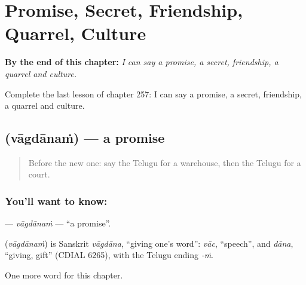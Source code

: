 
\chapter{Promise, Secret, Friendship, Quarrel, Culture}
\label{ch:te-promise-secret-friendship-quarrel-culture}

\begin{chapteropening}
\textbf{By the end of this chapter:} \emph{I can say a promise, a secret, friendship, a quarrel and culture.}

Complete the last lesson of chapter 257: I can say a promise, a secret, friendship, a quarrel and culture.
\end{chapteropening}

\section[\texorpdfstring{\te{వాగ్దానం} (vāgdānaṁ)}{వాగ్దానం (vāgdānaṁ)}]{ (vāgdānaṁ) — a promise}

\label{lesson:TE-C257-vagdanam}



\begin{quote}
Before the new one: say the Telugu for a warehouse, then the Telugu for a court.
\end{quote}

\subsection*{You'll want to know: }
\textbf{} — \emph{vāgdānaṁ} — \textquotedblleft{}a promise\textquotedblright{}.

\begin{cousinweb}
\textbf{} (\emph{vāgdānaṁ}) is Sanskrit \emph{vāgdāna}, \textquotedblleft{}giving one's word\textquotedblright{}: \emph{vāc}, \textquotedblleft{}speech\textquotedblright{}, and \emph{dāna}, \textquotedblleft{}giving, gift\textquotedblright{} (CDIAL 6265), with the Telugu ending \emph{-ṁ}.
\end{cousinweb}

\begin{grammarlens}[title={What you've built}]
One more word for this chapter.
\end{grammarlens}

